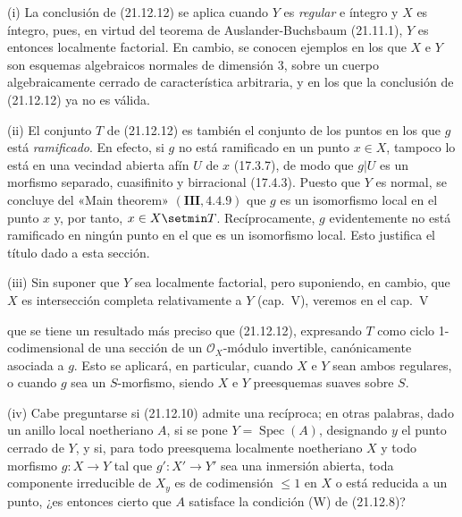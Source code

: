 \begin{remarks}[21.12.14]
\label{IV.21.12.14}
(i) La conclusión de (21.12.12) se aplica cuando $Y$ es \emph{regular} e íntegro y $X$ es
íntegro, pues, en virtud del teorema de Auslander-Buchsbaum (21.11.1), $Y$ es entonces
localmente factorial. En cambio, se conocen ejemplos en los que $X$ e $Y$ son esquemas
algebraicos normales de dimensión $3$, sobre un cuerpo algebraicamente cerrado de
característica arbitraria, y en los que la conclusión de (21.12.12) ya no es válida.

(ii) El conjunto $T$ de (21.12.12) es también el conjunto de los puntos en los que $g$ está
\emph{ramificado}. En efecto, si $g$ no está ramificado en un punto $x\in X$, tampoco lo está
en una vecindad abierta afín $U$ de $x$ (17.3.7), de modo que $g|U$ es un morfismo
separado, cuasifinito y birracional (17.4.3). Puesto que $Y$ es normal, se concluye del «Main
theorem» $(\mathbf{III}, 4.4.9)$ que $g$ es un isomorfismo local en el punto $x$ y, por tanto,
$x\in X\setmin T$. Recíprocamente, $g$ evidentemente no está ramificado en ningún punto en el que es un
isomorfismo local. Esto justifica el título dado a esta sección.


(iii) Sin suponer que $Y$ sea localmente factorial, pero suponiendo, en cambio, que
$X$ es intersección completa relativamente a $Y$ (cap.~V), veremos en el cap.~V

que se tiene un resultado más preciso que (21.12.12), expresando $T$ como ciclo
1-codimensional de una sección de un $\mathcal O_X$-módulo invertible, canónicamente
asociada a $g$. Esto se aplicará, en particular, cuando $X$ e $Y$ sean ambos regulares,
o cuando $g$ sea un $S$-morfismo, siendo $X$ e $Y$ preesquemas suaves sobre $S$.

(iv) Cabe preguntarse si (21.12.10) admite una recíproca; en otras palabras, dado un
anillo local noetheriano $A$, si se pone $Y=\operatorname{Spec}(A)$, designando $y$
el punto cerrado de $Y$, y si, para todo preesquema localmente noetheriano $X$ y
todo morfismo $g:X\to Y$ tal que $g':X'\to Y'$ sea una inmersión abierta, toda
componente irreducible de $X_y$ es de codimensión $\leq1$ en $X$ o está reducida a
un punto, ¿es entonces cierto que $A$ satisface la condición (W) de (21.12.8)?


\end{remarks}
